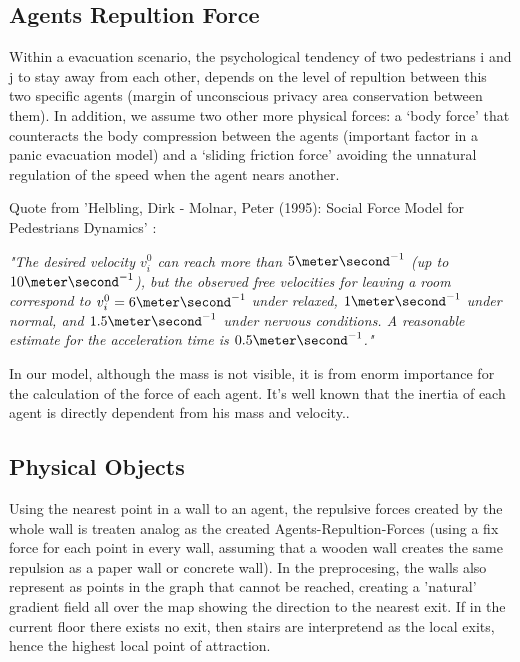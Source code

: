 \documentclass[11pt]{article}
\begin{document}
\subsection*{Agents Repultion Force}

Within a evacuation scenario, the psychological tendency of two pedestrians i and j to stay away from each other, depends on the level of repultion between this two specific agents (margin of unconscious privacy area conservation between them). In addition, we assume two other more physical forces: a `body force' that counteracts the body compression between the agents (important factor in a panic evacuation model) and a `sliding friction force' avoiding the unnatural regulation of the speed when the agent nears another. \cite{SFMPD} 

Quote from 'Helbling, Dirk - Molnar, Peter (1995): Social Force Model for Pedestrians Dynamics' \cite{SFMPD} :
\begin{center}
\textit{"The desired velocity $v^0_i$ can reach more than $5 \meter\second^{-1}$ (up to $10 \meter\second^{-1}$), but the observed free velocities	for	leaving	a	room	correspond	to	$v^0_i=6 \meter\second^{-1}$ under relaxed, $1\meter\second^{-1}$ under normal, and $1.5\meter\second^{-1}$ under nervous conditions. A reasonable estimate for the acceleration time is $0.5\meter\second^{-1}$."}
\end{center}
In our model, although the mass is not visible, it is from enorm importance for the calculation of the force of each agent. It's well known that the inertia of each agent is directly dependent from his mass and velocity..


\subsection*{Physical Objects}

Using the nearest point in a wall to an agent, the repulsive forces created by the whole wall is treaten analog as the created Agents-Repultion-Forces (using a fix force for each point in every wall, assuming that a wooden wall creates the same repulsion as a paper wall or concrete wall). In the preprocesing, the walls also represent as points in the graph that cannot be reached, creating a 'natural' gradient field all over the map showing the direction to the nearest exit. If in the current floor there exists no exit, then stairs are interpretend as the local exits, hence the highest local point of attraction. \cite{SFMPD} 
\end{document}
